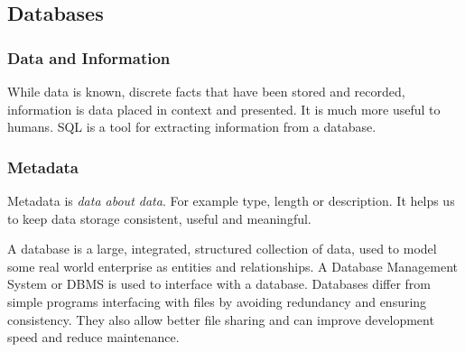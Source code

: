 \documentclass[12pt]{report}
\begin{document}
\begin{flushleft}

\section*{Databases}

\subsubsection*{Data and Information}

While data is known, discrete facts that have been stored and recorded,
information is data placed in context and presented. It is much more useful to
humans. SQL is a tool for extracting information from a database.

\subsubsection*{Metadata}

Metadata is \textit{data about data}. For example type, length or description.
It helps us to keep data storage consistent, useful and meaningful.

A database is a large, integrated, structured collection of data, used to model
some real world enterprise as entities and relationships. A Database Management
System or DBMS is used to interface with a database. Databases differ from
simple programs interfacing with files by avoiding redundancy and ensuring
consistency. They also allow better file sharing and can improve development
speed and reduce maintenance. 


\end{flushleft}
\end{document}
